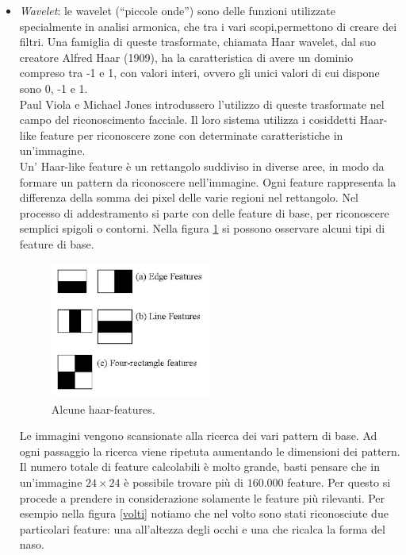 \begin{itemize}
\item \textit{Wavelet}: le wavelet (“piccole onde”) sono delle funzioni utilizzate specialmente in analisi armonica, che tra i vari scopi,permettono di creare dei  filtri. Una famiglia di queste trasformate, chiamata Haar wavelet, dal suo creatore Alfred  Haar (1909)\cite{haar-wavelet}, ha la caratteristica di avere un dominio compreso tra -1 e 1, con valori interi, ovvero gli unici valori di cui dispone sono 0, -1 e 1.\\
Paul Viola e Michael Jones \cite{viola-jones} introdussero l'utilizzo di queste trasformate nel campo del riconoscimento facciale. Il loro sistema utilizza i cosiddetti Haar-like feature per riconoscere zone con determinate caratteristiche in un'immagine\cite{haar-features}.\\
Un' Haar-like feature è un rettangolo suddiviso in diverse aree, in modo da formare un pattern da riconoscere nell'immagine. Ogni feature rappresenta la differenza della somma dei pixel delle varie regioni nel rettangolo. Nel processo di addestramento si parte con delle feature di base, per riconoscere semplici spigoli o contorni. Nella figura \ref{features} si possono osservare alcuni tipi di feature di base.\\
\begin{figure}[htbp]
\centering
\includegraphics[width=0.5\textwidth]{images/openCv/haar_features.jpg}
\caption{Alcune haar-features.\label{features}}
\end{figure}

Le immagini vengono scansionate alla ricerca dei vari pattern di base. Ad ogni passaggio la ricerca viene ripetuta aumentando le dimensioni dei pattern. Il numero totale di feature calcolabili è molto grande, basti pensare che in un'immagine $24\times 24$ è possibile trovare più di $160.000$ feature. Per questo si procede a prendere in considerazione solamente le feature più rilevanti.
Per esempio nella figura \ref{volti} notiamo che nel volto sono stati riconosciute due particolari feature: una all'altezza degli occhi e una che ricalca la forma del naso.


\end{itemize}
